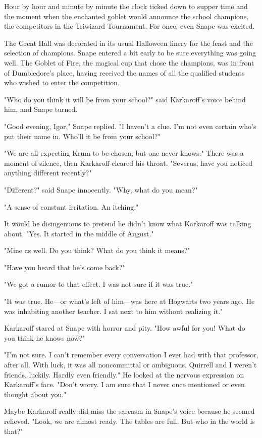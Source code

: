 Hour by hour and minute by minute the clock ticked down to supper time and the moment when the enchanted goblet would announce the school champions, the competitors in the Triwizard Tournament. For once, even Snape was excited.

The Great Hall was decorated in its usual Halloween finery for the feast and the selection of champions. Snape entered a bit early to be sure everything was going well. The Goblet of Fire, the magical cup that chose the champions, was in front of Dumbledore's place, having received the names of all the qualified students who wished to enter the competition.

"Who do you think it will be from your school?" said Karkaroff's voice behind him, and Snape turned.

"Good evening, Igor," Snape replied. "I haven't a clue. I'm not even certain who's put their name in. Who'll it be from your school?"

"We are all expecting Krum to be chosen, but one never knows." There was a moment of silence, then Karkaroff cleared his throat. "Severus, have you noticed anything{\el} different{\el} recently?"

"Different?" said Snape innocently. "Why, what do you mean?"

"A sense of{\el} constant irritation. An itching."

It would be disingenuous to pretend he didn't know what Karkaroff was talking about. "Yes. It started in the middle of August."

"Mine as well. Do you think{\el}? What do you think it means?"

"Have you heard that he's come back?"

"We got a rumor to that effect. I was not sure if it was true."

"It was true. He—or what's left of him—was here at Hogwarts two years ago. He was inhabiting another teacher. I sat next to him without realizing it."

Karkaroff stared at Snape with horror and pity. "How awful for you! What do you think he knows now?"

"I'm not sure. I can't remember every conversation I ever had with that professor, after all. With luck, it was all noncommittal or ambiguous. Quirrell and I weren't friends, luckily. Hardly even friendly." He looked at the nervous expression on Karkaroff's face. "Don't worry. I am sure that I never once mentioned or even thought about you."

Maybe Karkaroff really did miss the sarcasm in Snape's voice because he seemed relieved. "Look, we are almost ready. The tables are full. But who in the world is that?"

